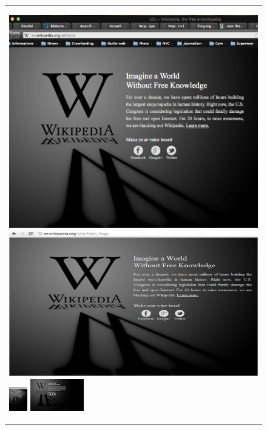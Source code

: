 \begin{figure}
\begin{tabular}{p{\textwidth}}
\begin{thumbsequence}
	\end{thumbsequence}
	\newstrip
	\begin{thumbsequence}
		\includegraphics[height=\thumbheight]{sopa/looseduplicate9.png}
		\includegraphics[height=\thumbheight]{sopa/looseduplicate10.png}
		\includegraphics[height=\thumbheight]{sopa/looseduplicate11.jpg}
		\includegraphics[height=\thumbheight]{sopa/looseduplicate12.jpg}
	\end{thumbsequence}

\end{tabular}
\end{figure}
